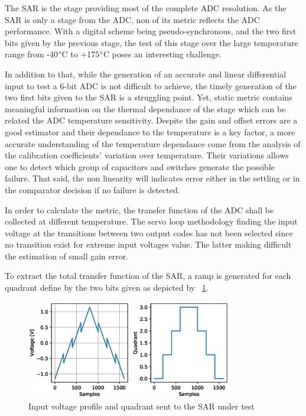 The SAR is the stage providing most of the complete ADC resolution. As the SAR is only a stage from the ADC, non of its metric reflects the ADC performance. With a digital scheme being pseudo-synchronous, and the two first bits given by the previous stage, the test of this stage over the large temperature range from -40\(\degree \)C to +175\(\degree \)C poses an interesting challenge.

In addition to that, while the generation of an accurate and linear differential input to test a 6-bit ADC is not difficult to achieve, the timely generation of the two first bits given to the SAR is a struggling point. Yet, static metric contains meaningful information on the thermal dependance of the stage which can be related the ADC temperature sensitivity. Despite the gain and offset errors are a good estimator and their dependance to the temperature is a key factor, a more accurate understanding of the temperature dependance come from the analysis of the calibration coefficients' variation over temperature. Their variations allows one to detect which group of capacitors and switches generate the possible failure. That said, the non linearity will indicates error either in the settling or in the comparator decision if no failure is detected.

In order to calculate the metric, the transfer function of the ADC shall be collected at different temperature. The servo loop methodology finding the input voltage at the transitions between two output codes has not been selected since no transition exist for extreme input voltages value. The latter making difficult the estimation of small gain error.

To extract the total transfer function of the SAR, a ramp is generated for each quadrant define by the two bits given as depicted by \figurename~\ref{fig:sar-test-input}. 

\begin{figure}[htp]
    \centering
    \includegraphics[width=0.8\textwidth]{Chapter5/Figs/sar_test/sar-test-input.eps}
    \caption{Input voltage profile and quadrant sent to the SAR under test}
    \label{fig:sar-test-input}
\end{figure}

